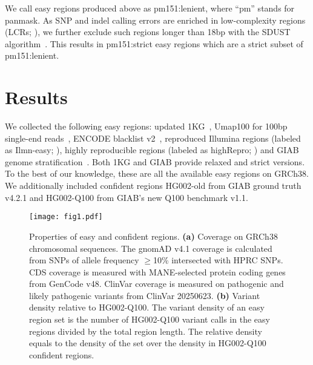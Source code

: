 \documentclass[webpdf,contemporary,large,namedate]{oup-authoring-template}%
\begin{document}
We call easy regions produced above as {\sf pm151:lenient}, where ``pm'' stands for panmask.
As SNP and indel calling errors are enriched in low-complexity regions (LCRs; \citealp{Li:2014aa}),
we further exclude such regions longer than 18bp with the SDUST algorithm~\citep{Morgulis:2006aa}.
This results in {\sf pm151:strict} easy regions which are a strict subset of {\sf pm151:lenient}.

\section{Results}

We collected the following easy regions:
updated {\sf 1KG}~\citep{1000-Genomes-Project-Consortium:2010qc},
{\sf Umap100} for 100bp single-end reads~\citep{Karimzadeh:2018aa},
{\sf ENCODE} blacklist v2~\citep{Amemiya:2019aa},
reproduced Illumina regions (labeled as {\sf Ilmn-easy}; \citealp{Aganezov:2022aa}),
highly reproducible regions (labeled as {\sf highRepro}; \citealp{Pan:2022aa})
and {\sf GIAB} genome stratification~\citep{Dwarshuis:2024aa}.
Both {\sf 1KG} and {\sf GIAB} provide relaxed and strict versions.
To the best of our knowledge, these are all the available easy regions on GRCh38.
We additionally included confident regions {\sf HG002-old} from GIAB ground truth v4.2.1
and {\sf HG002-Q100} from GIAB's new Q100 benchmark v1.1.

\begin{figure}[tb]
\centering
\texttt{[image: fig1.pdf]}
\caption{Properties of easy and confident regions.
{\bf (a)} Coverage on GRCh38 chromosomal sequences.
The gnomAD v4.1 coverage is calculated from SNPs of allele frequency $\ge$10\% intersected with HPRC SNPs.
CDS coverage is measured with MANE-selected protein coding genes from GenCode v48.
ClinVar coverage is measured on pathogenic and likely pathogenic variants from ClinVar 20250623.
{\bf (b)} Variant density relative to HG002-Q100.
The variant density of an easy region set is the number of HG002-Q100 variant calls in the easy regions divided by the total region length.
The relative density equals to the density of the set over the density in HG002-Q100 confident regions.
}\label{fig:cov}
\end{figure}
\end{document}
